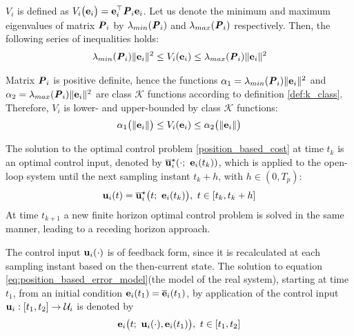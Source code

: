 \begin{gg_box}
  $V_i$ is defined as
  $V_i\big(\bm{\mathbf{e}}_i\big) = \bm{\mathbf{e}}_i^{\top} \bm{\mathit{P}}_i \bm{\mathbf{e}}_i$.
  Let us denote the minimum and maximum eigenvalues of matrix $\bm{\mathit{P}}_i$ by
  $\lambda_{min}(\bm{\mathit{P}}_i)$ and $\lambda_{max}(\bm{\mathit{P}}_i)$ respectively.
  Then, the following series of inequalities holds:
\begin{align}
  \lambda_{min}(\bm{\mathit{P}}_i) \|\bm{\mathbf{e}}_i\|^2 \leq V_i(\bm{\mathbf{e}}_i) \leq \lambda_{max}(\bm{\mathit{P}}_i) \|\bm{\mathbf{e}}_i\|^2
\end{align}

Matrix $\bm{\mathit{P}}_i$ is positive definite, hence the functions
$\alpha_1 = \lambda_{min}(\bm{\mathit{P}}_i) \|\bm{\mathbf{e}}_i\|^2$ and
$\alpha_2 = \lambda_{max}(\bm{\mathit{P}}_i) \|\bm{\mathbf{e}}_i\|^2$ are
class $\mathcal{K}$ functions according to definition \eqref{def:k_class}.
Therefore, $V_i$ is lower- and upper-bounded by class $\mathcal{K}$ functions:
\begin{align}
  \alpha_1\big(\|\bm{\mathbf{e}}_i\|\big) \leq V_i(\bm{\mathbf{e}}_i) \leq \alpha_2\big(\| \bm{\mathbf{e}}_i \|\big)
\end{align}
\end{gg_box}


The solution to the optimal control problem \eqref{position_based_cost}
at time $t_k$ is an optimal control input, denoted by
$\overline{\bm{\mathbf{u}}}_i^{\star}(\cdot;\ \bm{\mathbf{e}}_i(t_k))$, which
is applied to the open-loop system until the next sampling instant $t_k + h$,
with $h \in (0,T_p)$:
\begin{align}
  \bm{\mathbf{u}}_i(t) = \overline{\bm{\mathbf{u}}}_i^{\star}\big(t;\ \bm{\mathbf{e}}_i(t_k)\big),\  t \in [t_k, t_k + h]
 \label{eq:position_based_optimal_u}
\end{align}
At time $t_{k+1}$ a new finite horizon optimal control problem is solved in the
same manner, leading to a receding horizon approach.

The control input $\bm{\mathbf{u}}_i(\cdot)$ is of feedback form,
since it is recalculated at each sampling instant based on the then-current
state. The solution to equation \eqref{eq:position_based_error_model}(the model
of the real system), starting at time $t_1$, from an initial condition
$\bm{\mathbf{e}}_i(t_1) = \overline{\bm{\mathbf{e}}}_i(t_1)$,
by application of the control input $\bm{\mathbf{u}}_i : [t_1, t_2] \to \mathcal{U}_i$
is denoted by
\begin{align}
  \bm{\mathbf{e}}_i\big(t;\ \bm{\mathbf{u}}_i(\cdot), \bm{\mathbf{e}}_i(t_1)\big),\ t \in [t_1, t_2]
\end{align}


